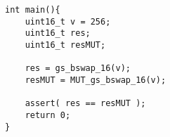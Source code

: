 \begin{minipage}{14cm}
\begin{lstlisting}[style=CStyle, caption=Example of test case for function \emph{gs\_bswap\_16} derived from KLEE output., label=GSLaugmentationTest_klee]
int main(){
    uint16_t v = 256;                                                                                                                                  
    uint16_t res;
    uint16_t resMUT;

    res = gs_bswap_16(v);
    resMUT = MUT_gs_bswap_16(v);

    assert( res == resMUT );
    return 0;
}
\end{lstlisting}
\end{minipage}
